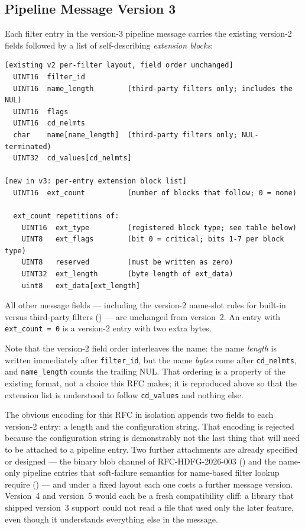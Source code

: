 \documentclass[../RFC-HDFG-2026-001.tex]{subfiles}
\begin{document}
\subsection{Pipeline Message Version 3}
\label{sec:pline-v3-layout}

Each filter entry in the version-3 pipeline message carries the existing
version-2 fields followed by a list of self-describing \emph{extension
blocks}:

\begin{Verbatim}[fontsize=\scriptsize]
[existing v2 per-filter layout, field order unchanged]
  UINT16  filter_id
  UINT16  name_length        (third-party filters only; includes the NUL)
  UINT16  flags
  UINT16  cd_nelmts
  char    name[name_length]  (third-party filters only; NUL-terminated)
  UINT32  cd_values[cd_nelmts]

[new in v3: per-entry extension block list]
  UINT16  ext_count          (number of blocks that follow; 0 = none)

  ext_count repetitions of:
    UINT16  ext_type         (registered block type; see table below)
    UINT8   ext_flags        (bit 0 = critical; bits 1-7 per block type)
    UINT8   reserved         (must be written as zero)
    UINT32  ext_length       (byte length of ext_data)
    uint8   ext_data[ext_length]
\end{Verbatim}

All other message fields --- including the version-2 name-slot rules for
built-in versus third-party filters () ---
are unchanged from version~2.  An entry with \texttt{ext\_count = 0} is a
version-2 entry with two extra bytes.

Note that the version-2 field order interleaves the name: the name
\emph{length} is written immediately after \texttt{filter\_id}, but the
name \emph{bytes} come after \texttt{cd\_nelmts}, and
\texttt{name\_length} counts the trailing NUL.  That ordering is a
property of the existing format, not a choice this RFC makes; it is
reproduced above so that the extension list is understood to follow
\texttt{cd\_values} and nothing else.


The obvious encoding for this RFC in isolation appends two fields to each
version-2 entry: a length and the configuration string.  That encoding is
rejected because the configuration string is demonstrably not the last
thing that will need to be attached to a pipeline entry.  Two further
attachments are already specified or designed --- the binary blob channel
of RFC-HDFG-2026-003 () and the name-only
pipeline entries that soft-failure semantics for name-based filter lookup
require () --- and under a fixed
layout each one costs a further message version.  Version~4 and version~5
would each be a fresh compatibility cliff: a library that shipped
version~3 support could not read a file that used only the later feature,
even though it understands everything else in the message.
\end{document}
